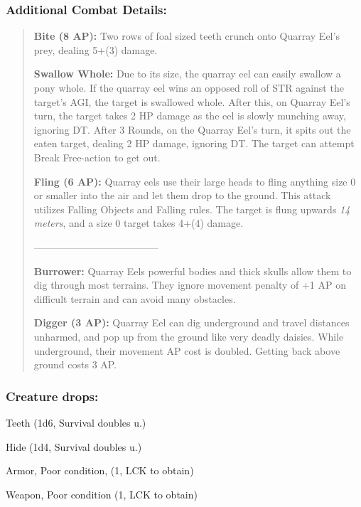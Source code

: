 \documentclass[11pt,a4paper,twocolumn]{book}
\begin{document}
	\subsubsection*{Additional Combat Details:}
	\begin{verse}
		\textbf{Bite (8 AP):} Two rows of foal sized teeth crunch onto Quarray Eel's prey, dealing 5+(3) damage.
		
		\textbf{Swallow Whole:} Due to its size, the quarray eel can easily swallow a pony whole. If the quarray eel wins an opposed roll of STR against the target's AGI, the target is swallowed whole. After this, on Quarray Eel's turn, the target takes 2 HP damage as the eel is slowly munching away, ignoring DT. After 3 Rounds, on the Quarray Eel's turn, it spits out the eaten target, dealing 2 HP damage, ignoring DT. The target can attempt Break Free-action to get out. 
		
		\textbf{Fling (6 AP):} Quarray eels use their large heads to fling anything size 0 or smaller into the air and let them drop to the ground. This attack utilizes Falling Objects and Falling rules. The target is flung upwards \textit{14 meters}, and a size 0 target takes 4+(4) damage.
		
		--------------------------------------
		
		\textbf{Burrower:} Quarray Eels powerful bodies and thick skulls allow them to dig through most terrains. They ignore movement penalty of +1 AP on difficult terrain and can avoid many obstacles.
		
		\textbf{Digger (3 AP):} Quarray Eel can dig underground and travel distances unharmed, and pop up from the ground like very deadly daisies. While underground, their movement AP cost is doubled. Getting back above ground costs 3 AP.
		
%		
	\end{verse}
	
	\subsubsection*{Creature drops:}
	\begin{compactitem}
		\item Teeth (1d6, Survival doubles u.)
		\item Hide (1d4, Survival doubles u.)
		\item Armor, Poor condition, (1, LCK to obtain)
		\item Weapon, Poor condition (1, LCK to obtain)
	\end{compactitem}
	
\end{document}
